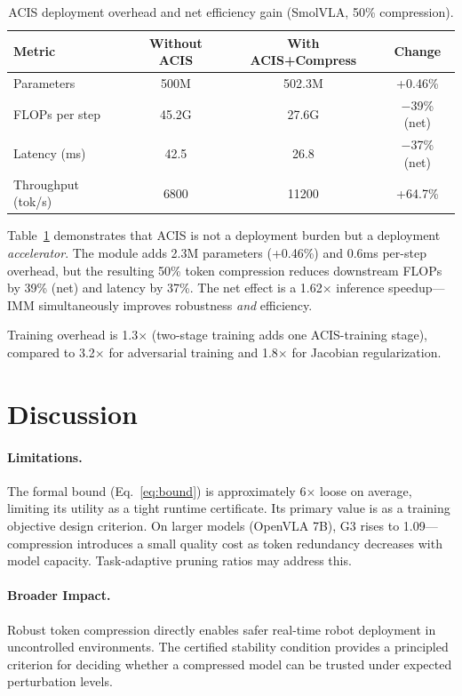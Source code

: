 \documentclass[conference]{corl_2026}
\newcommand{\ours}{IMM}
\newcommand{\acis}{ACIS}
\begin{document}
\begin{table}[t]
\centering
\caption{ACIS deployment overhead and net efficiency gain (SmolVLA, 50\% compression).}
\label{tab:overhead}
\footnotesize
\begin{tabular}{@{}lccc@{}}
\toprule
Metric & Without ACIS & With ACIS+Compress & Change \\
\midrule
Parameters & 500M & 502.3M & +0.46\% \\
FLOPs per step & 45.2G & 27.6G & $-$39\% (net) \\
Latency (ms) & 42.5 & 26.8 & $-$37\% (net) \\
Throughput (tok/s) & 6800 & 11200 & +64.7\% \\
\bottomrule
\end{tabular}
\end{table}

Table~\ref{tab:overhead} demonstrates that ACIS is not a deployment burden but a deployment \emph{accelerator}. The module adds 2.3M parameters (+0.46\%) and 0.6ms per-step overhead, but the resulting 50\% token compression reduces downstream FLOPs by 39\% (net) and latency by 37\%. The net effect is a 1.62$\times$ inference speedup---\ours{} simultaneously improves robustness \emph{and} efficiency.

Training overhead is 1.3$\times$ (two-stage training adds one \acis{}-training stage), compared to 3.2$\times$ for adversarial training and 1.8$\times$ for Jacobian regularization.

\section{Discussion}
\label{sec:discussion}

\paragraph{Limitations.}
The formal bound (Eq.~\ref{eq:bound}) is approximately 6$\times$ loose on average, limiting its utility as a tight runtime certificate. Its primary value is as a training objective design criterion. On larger models (OpenVLA 7B), G3 rises to 1.09---compression introduces a small quality cost as token redundancy decreases with model capacity. Task-adaptive pruning ratios may address this.

\paragraph{Broader Impact.}
Robust token compression directly enables safer real-time robot deployment in uncontrolled environments. The certified stability condition provides a principled criterion for deciding whether a compressed model can be trusted under expected perturbation levels.
\end{document}
